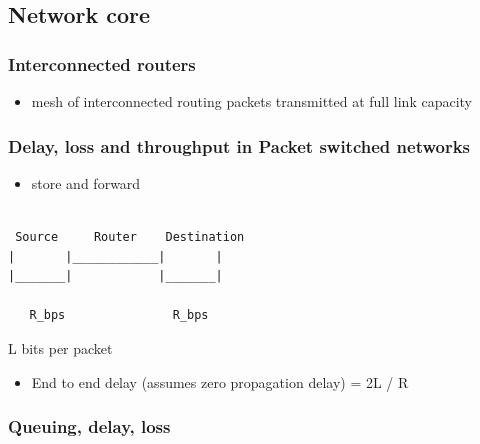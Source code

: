 \documentclass[11pt]{article}
\begin{document}
\subsection{Network core}
\label{sec:orgb33dbdf}
\subsubsection{Interconnected routers}
\label{sec:orga43f39e}
\begin{itemize}
\item mesh of interconnected routing packets transmitted at full link
capacity
\end{itemize}

\subsubsection{Delay, loss and throughput in Packet switched networks}
\label{sec:orgd48567e}

\begin{itemize}
\item store and forward
\end{itemize}


\begin{verbatim}

 Source     Router    Destination
|       |____________|       |
|_______|            |_______|

   R_bps               R_bps
\end{verbatim}

L bits per packet

\begin{itemize}
\item End to end delay (assumes zero propagation delay) = 2L / R
\end{itemize}

\subsubsection{Queuing, delay, loss}
\label{sec:orge6a98ff}
\end{document}
